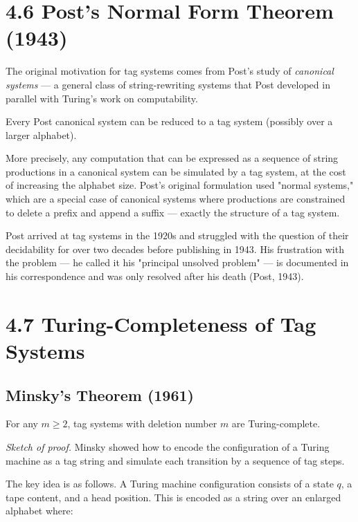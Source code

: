 \section{4.6 Post's Normal Form Theorem (1943)}

The original motivation for tag systems comes from Post's study of \textit{canonical systems} --- a general class of string-rewriting systems that Post developed in parallel with Turing's work on computability.

\begin{theorem}
Every Post canonical system can be reduced to a tag system (possibly over a larger alphabet).

More precisely, any computation that can be expressed as a sequence of string productions in a canonical system can be simulated by a tag system, at the cost of increasing the alphabet size. Post's original formulation used "normal systems," which are a special case of canonical systems where productions are constrained to delete a prefix and append a suffix --- exactly the structure of a tag system.

Post arrived at tag systems in the 1920s and struggled with the question of their decidability for over two decades before publishing in 1943. His frustration with the problem --- he called it his "principal unsolved problem" --- is documented in his correspondence and was only resolved after his death (Post, 1943).
\end{theorem}

\section{4.7 Turing-Completeness of Tag Systems}

\subsection{Minsky's Theorem (1961)}

\begin{theorem}[Minsky, 1961]
For any $m \geq 2$, tag systems with deletion number $m$ are Turing-complete.

\textit{Sketch of proof.} Minsky showed how to encode the configuration of a Turing machine as a tag string and simulate each transition by a sequence of tag steps.

The key idea is as follows. A Turing machine configuration consists of a state $q$, a tape content, and a head position. This is encoded as a string over an enlarged alphabet where:
\end{theorem}

